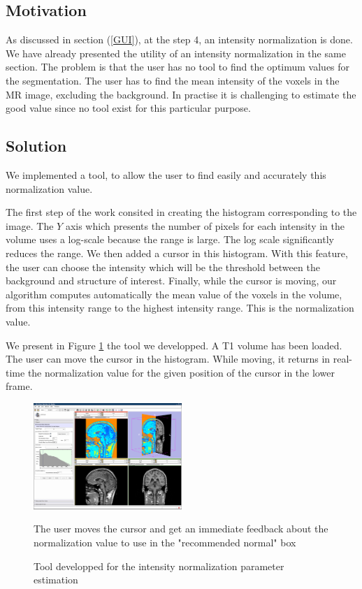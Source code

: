 \subsection{Motivation}
As discussed in section (\ref{GUI}), at the step 4, an intensity normalization is done. We have already presented the utility of an intensity normalization in the same section. The problem is that the user has no tool to find the optimum values for the segmentation. The user has to find the mean intensity of the voxels in the MR image, excluding the background. In practise it is challenging to estimate the good value since no tool exist for this particular purpose.
%
\subsection{Solution}
We implemented a tool, to allow the user to find easily and accurately this normalization value.
\par
The first step of the work consited in creating the histogram corresponding to the image. The $Y$ axis which presents the number of pixels for each intensity in the volume uses a log-scale because the range is large. The log scale significantly reduces the range. We then added a cursor in this histogram. With this feature, the user can choose the intensity which will be the threshold between the background and structure of interest. Finally, while the cursor is moving, our algorithm computes automatically the mean value of the voxels in the volume, from this intensity range to the highest intensity range. This is the normalization value.
\par
We present in Figure \ref{fig:intensitynormalization2} the tool we developped. A T1 volume has been loaded. The user can move the cursor in the histogram. While moving, it returns in real-time the normalization value for the given position of the cursor in the lower frame.

\begin{figure}\centering
  \includegraphics[width=0.5\textwidth]{Images/Screenshots/intensityNormalization.png}
  \caption{Tool developped for the intensity normalization parameter estimation}{The user moves the cursor and get an immediate feedback about the normalization value to use in the "recommended normal" box}\label{fig:intensitynormalization2}
\end{figure}
%


